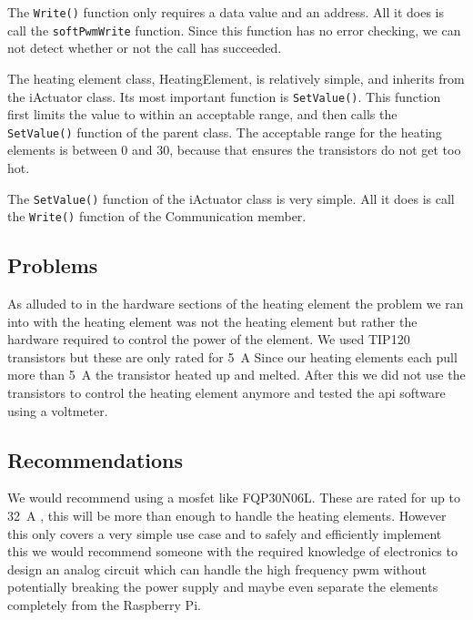 \documentclass[a4paper,oneside]{book}
\begin{document}


The \lstinline|Write()| function only requires a data value and an address. All
it does is call the \lstinline|softPwmWrite| function. Since this function has
no error checking, we can not detect whether or not the call has succeeded.



The heating element class, HeatingElement, is relatively simple, and inherits
from the iActuator class. Its most important function is
\lstinline|SetValue()|. This function first limits the value to within an
acceptable range, and then calls the \lstinline|SetValue()| function of the
parent class. The acceptable range for the heating elements is between 0 and
30, because that ensures the transistors do not get too hot.



The \lstinline|SetValue()| function of the iActuator class is very simple. All
it does is call the \lstinline|Write()| function of the Communication member.



\subsection{Problems}
As alluded to in the hardware sections of the heating element the problem we
ran into with the heating element was not the heating element but rather the
hardware required to control the power of the element. We used TIP120
transistors but these are only rated for \SI{5}{\ampere} \cite{Transistor}
Since our heating elements each pull more than \SI{5}{\ampere} \cite{Heating}
the transistor heated up and melted. After this we did not use the transistors
to control the heating element anymore and tested the api software using a
voltmeter.

\subsection{Recommendations}
We would recommend using a mosfet like FQP30N06L. These are rated for up to
\SI{32}{\ampere} \cite{FQP30N06L}, this will be more than enough to handle the
heating elements. However this only covers a very simple use case and to safely
and efficiently implement this we would recommend someone with the required
knowledge of electronics  to design an analog circuit which can handle the high
frequency pwm without potentially breaking the power supply and maybe even
separate the elements completely from the Raspberry Pi.
\end{document}
